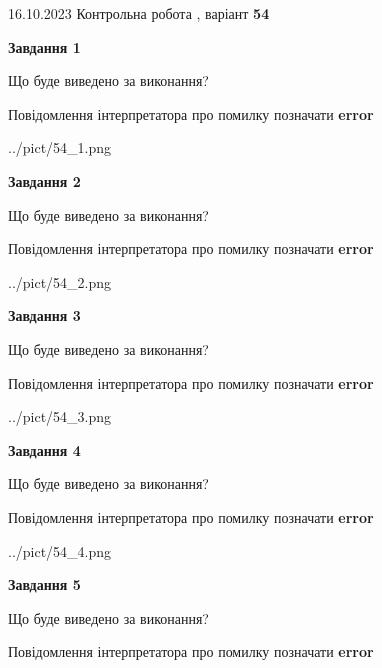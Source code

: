 \documentclass[12pt, ukrainian]{article}
\begin{document}
{\Large{16.10.2023 Контрольна робота , варіант  \No \textbf { 54 }\par}}
{
\begin {large}
{\begin {center}\textbf{Завдання 1}\end {center}}\par
Що буде виведено за виконання? \par
Повідомлення інтерпретатора про помилку позначати \textbf{error}

\begin{center}
	{../pict/54_1.png}
\end{center}
\newpage

{\begin {center}\textbf{Завдання 2}\end {center}}\par
Що буде виведено за виконання? \par
Повідомлення інтерпретатора про помилку позначати \textbf{error}

\begin{center}
	{../pict/54_2.png}
\end{center}
\newpage

{\begin {center}\textbf{Завдання 3}\end {center}}\par
Що буде виведено за виконання? \par
Повідомлення інтерпретатора про помилку позначати \textbf{error}

\begin{center}
	{../pict/54_3.png}
\end{center}
\newpage

{\begin {center}\textbf{Завдання 4}\end {center}}\par
Що буде виведено за виконання? \par
Повідомлення інтерпретатора про помилку позначати \textbf{error}

\begin{center}
	{../pict/54_4.png}
\end{center}
\newpage

{\begin {center}\textbf{Завдання 5}\end {center}}\par
Що буде виведено за виконання? \par
Повідомлення інтерпретатора про помилку позначати \textbf{error}


\end{large}}
\end{document}
